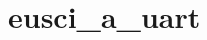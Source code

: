 \hypertarget{group__eusci__a__uart__api}{}\section{eusci\+\_\+a\+\_\+uart}
\label{group__eusci__a__uart__api}
